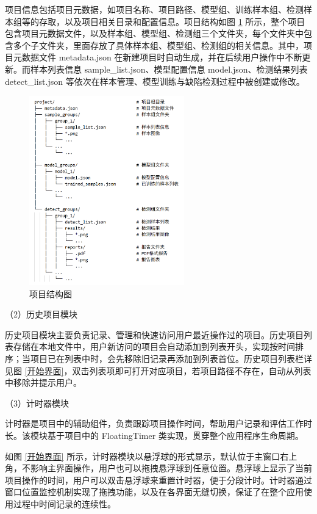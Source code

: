 \documentclass[
  ]{njuthesis}
\begin{document}
项目信息包括项目元数据，如项目名称、项目路径、模型组、训练样本组、检测样本组等的存取，以及项目相关目录和配置信息。项目结构如图 \ref{项目结构图} 所示，整个项目包含项目元数据文件，以及样本组、模型组、检测组三个文件夹，每个文件夹中包含多个子文件夹，里面存放了具体样本组、模型组、检测组的相关信息。其中，项目元数据文件 metadata.json 在新建项目时自动生成，并在后续用户操作中不断更新。而样本列表信息 sample\_list.json、模型配置信息 model.json、检测结果列表 detect\_list.json 等依次在样本管理、模型训练与缺陷检测过程中被创建或修改。

\begin{figure}[htb]
    \centering
    \includegraphics[width=0.6\textwidth]{images/项目结构图.png}
    \caption{项目结构图}
    \label{项目结构图}
\end{figure}

（2）历史项目模块

历史项目模块主要负责记录、管理和快速访问用户最近操作过的项目。历史项目列表存储在本地文件中，用户新访问的项目会自动添加到列表开头，实现按时间排序；当项目已在列表中时，会先移除旧记录再添加到列表首位。历史项目列表栏详见图 \ref{开始界面}，双击列表项即可打开对应项目，若项目路径不存在，自动从列表中移除并提示用户。

（3）计时器模块

计时器是项目中的辅助组件，负责跟踪项目操作时间，帮助用户记录和评估工作时长。该模块基于项目中的 FloatingTimer 类实现，贯穿整个应用程序生命周期。

如图 \ref{开始界面} 所示，计时器模块以悬浮球的形式显示，默认位于主窗口右上角，不影响主界面操作，用户也可以拖拽悬浮球到任意位置。悬浮球上显示了当前项目操作的时间，用户可以双击悬浮球来重置计时器，便于分段计时。计时器通过窗口位置监控机制实现了拖拽功能，以及在各界面无缝切换，保证了在整个应用使用过程中时间记录的连续性。
\end{document}
